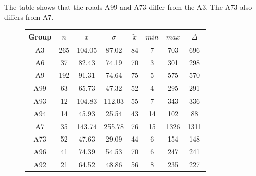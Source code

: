 The table shows that the roads A99 and A73 differ from the A3. The A73 also differs from A7.
\data
{}
\begin{figure}[ht!]
	\centering
	\begin{minipage}{0.5\textwidth}
		\tiny
		\centering
		\begin{tabular}{c|c|c|c|c|c|c|c}
			\toprule
			Group & $n$ & $\bar{x}$ & $\sigma$ & $\tilde{x}$ & $min$ & $max$ & $\Delta$ \\
			\midrule
			A3   & 265 & 104.05 & 87.02  & 84 & 7  & 703  & 696  \\ 
			A6   & 37  & 82.43  & 74.19  & 70 & 3  & 301  & 298  \\ 
			A9   & 192 & 91.31  & 74.64  & 75 & 5  & 575  & 570  \\  
			A99  & 63  & 65.73  & 47.32  & 52 & 4  & 295  & 291  \\ 
			A93  & 12  & 104.83 & 112.03 & 55 & 7  & 343  & 336  \\ 
			A94  & 14  & 45.93  & 25.54  & 43 & 14 & 102  & 88   \\ 
			A7   & 35  & 143.74 & 255.78 & 76 & 15 & 1326 & 1311 \\ 
			A73  & 52  & 47.63  & 29.09  & 44 & 6  & 154  & 148  \\ 
			A96  & 41  & 74.39  & 54.53  & 70 & 6  & 247  & 241  \\ 
			A92  & 21  & 64.52  & 48.86  & 56 & 8  & 235  & 227  \\ 
			\bottomrule
		\end{tabular}
		\label{tbl:descriptives_baysis_effector_Street_TAvg}
	\end{minipage}%
	\begin{minipage}{0.55\textwidth}

\end{minipage}
\end{figure}
